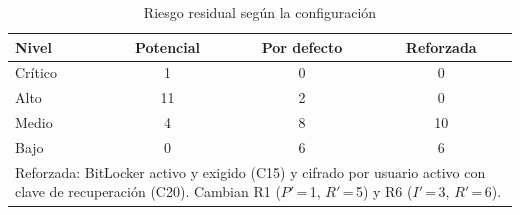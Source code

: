 \documentclass[conference]{IEEEtran}
\begin{document}
\begin{table}[!htb]
\caption{Riesgo residual según la configuración}
\label{tab:config}
\centering
\footnotesize
\setlength{\tabcolsep}{4pt}
\begin{tabular}{|l|c|c|c|}
\hline
\textbf{Nivel} & \textbf{Potencial} & \textbf{Por defecto} & \textbf{Reforzada} \\
\hline
\cellcolor{rcritico}Crítico & 1 & 0 & 0 \\
\hline
\cellcolor{ralto}Alto & 11 & 2 & 0 \\
\hline
\cellcolor{rmedio}Medio & 4 & 8 & 10 \\
\hline
\cellcolor{rbajo}Bajo & 0 & 6 & 6 \\
\hline
\multicolumn{4}{|p{7.4cm}|}{\scriptsize Reforzada: BitLocker activo y exigido (C15) y cifrado por usuario activo con clave de recuperación (C20). Cambian R1 ($P'$\,=\,1, $R'$\,=\,5) y R6 ($I'$\,=\,3, $R'$\,=\,6).} \\
\hline
\end{tabular}
\end{table}
\end{document}

